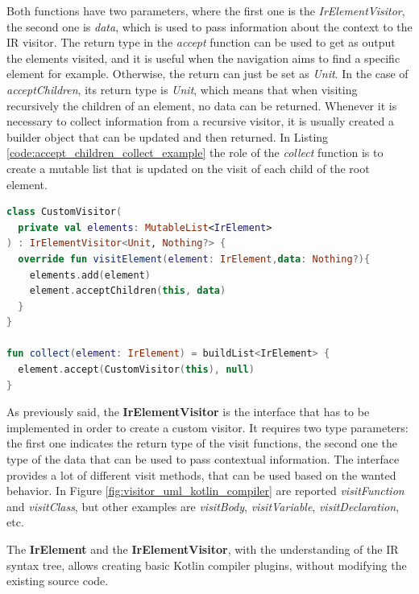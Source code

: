 Both functions have two parameters, where the first one is the \textit{IrElementVisitor}, the second one is \textit{data}, which is used to pass information about the context to the IR visitor.\newline
The return type in the \textit{accept} function can be used to get as output the elements visited, and it is useful when the navigation aims to find a specific element for example. Otherwise, the return can just be set as \textit{Unit}.\newline
In the case of \textit{acceptChildren}, its return type is \textit{Unit}, which means that when visiting recursively the children of an element, no data can be returned. Whenever it is necessary to collect information from a recursive visitor, it is usually created a builder object that can be updated and then returned. In Listing \ref{code:accept_children_collect_example} the role of the \textit{collect} function is to create a mutable list that is updated on the visit of each child of the root element.
\begin{lstlisting}[caption={Example of a custom visitor and a function that supports the collection of elements \cite{visitor_koltin_compiler}}, captionpos=b, language=Kotlin, label={code:accept_children_collect_example}]
class CustomVisitor(
  private val elements: MutableList<IrElement>
) : IrElementVisitor<Unit, Nothing?> {
  override fun visitElement(element: IrElement,data: Nothing?){
    elements.add(element)
    element.acceptChildren(this, data)
  }
}

fun collect(element: IrElement) = buildList<IrElement> {
  element.accept(CustomVisitor(this), null)
}
\end{lstlisting}

As previously said, the \textbf{IrElementVisitor} is the interface that has to be implemented in order to create a custom visitor. It requires two type parameters: the first one indicates the return type of the visit functions, the second one the type of the data that can be used to pass contextual information. The interface provides a lot of different visit methods, that can be used based on the wanted behavior. In Figure \ref{fig:visitor_uml_kotlin_compiler} are reported \textit{visitFunction} and \textit{visitClass}, but other examples are \textit{visitBody}, \textit{visitVariable}, \textit{visitDeclaration}, etc.

The \textbf{IrElement} and the \textbf{IrElementVisitor}, with the understanding of the IR syntax tree, allows creating basic Kotlin compiler plugins, without modifying the existing source code.

